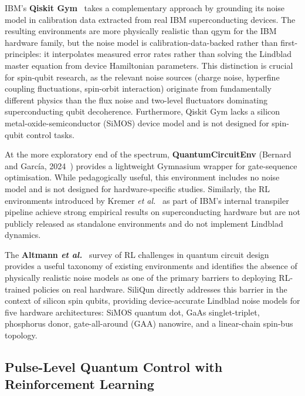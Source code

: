 IBM's \textbf{Qiskit Gym}~\cite{QiskitGym2024} takes a complementary
approach by grounding its noise model in calibration data extracted from
real IBM superconducting devices. The resulting environments are more
physically realistic than qgym for the IBM hardware family, but the noise
model is calibration-data-backed rather than first-principles: it
interpolates measured error rates rather than solving the Lindblad master
equation from device Hamiltonian parameters. This distinction is crucial for spin-qubit research, as the relevant noise
sources (charge noise, hyperfine coupling fluctuations, spin-orbit
interaction) originate from fundamentally different physics than the flux
noise and two-level fluctuators dominating superconducting qubit
decoherence. Furthermore, Qiskit Gym lacks a silicon metal-oxide-semiconductor (SiMOS) device model and is not
designed for spin-qubit control tasks.

At the more exploratory end of the spectrum, \textbf{QuantumCircuitEnv}
(Bernard and García, 2024~\cite{Bernard2024QuantumCircuitEnv}) provides a
lightweight Gymnasium wrapper for gate-sequence optimisation. While
pedagogically useful, this environment includes no noise model and is not
designed for hardware-specific studies. Similarly, the RL environments
introduced by Kremer \emph{et al.}~\cite{Kremer2024} as part of IBM's
internal transpiler pipeline achieve strong empirical results on
superconducting hardware but are not publicly released as standalone
environments and do not implement Lindblad dynamics.

The \textbf{Altmann \emph{et al.}}~\cite{Altmann2024challenges} survey of
RL challenges in quantum circuit design provides a useful taxonomy of
existing environments and identifies the absence of physically realistic
noise models as one of the primary barriers to deploying RL-trained policies
on real hardware. SiliQun directly addresses this barrier in the context of silicon spin qubits, providing device-accurate Lindblad noise models for five hardware architectures: SiMOS quantum dot, GaAs singlet-triplet, phosphorus donor, gate-all-around (GAA) nanowire, and a linear-chain spin-bus topology.

\subsection{Pulse-Level Quantum Control with Reinforcement Learning}
\label{sec:rw_pulse}


